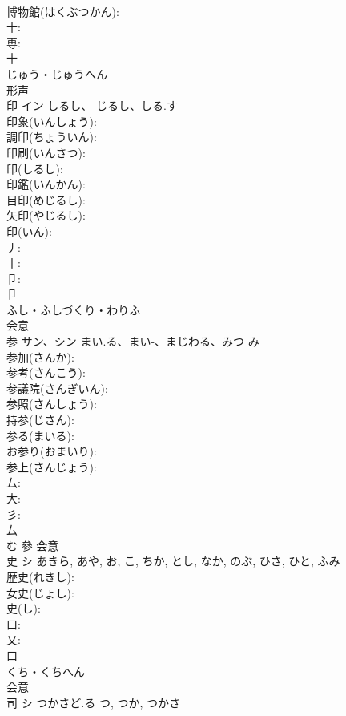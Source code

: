 \documentclass[8pt]{extreport}
\begin{document}
\begin{CJK}{UTF8}{min}
\\	博物館(はくぶつかん): 
\\	十: 
\\	尃: 
\\	十	
\\	じゅう・じゅうへん	
\\	形声 
\\	印	イン	しるし、-じるし、しる.す		
\\	印象(いんしょう): 
\\	調印(ちょういん): 
\\	印刷(いんさつ): 
\\	印(しるし): 
\\	印鑑(いんかん): 
\\	目印(めじるし): 
\\	矢印(やじるし): 
\\	印(いん): 
\\	丿: 
\\	丨: 
\\	卩: 
\\	卩	
\\	ふし・ふしづくり・わりふ	
\\	会意 
\\	参	サン、シン	まい.る、まい-、まじわる、みつ	み	
\\	参加(さんか): 
\\	参考(さんこう): 
\\	参議院(さんぎいん): 
\\	参照(さんしょう): 
\\	持参(じさん): 
\\	参る(まいる): 
\\	お参り(おまいり): 
\\	参上(さんじょう): 
\\	厶: 
\\	大: 
\\	彡: 
\\	厶	
\\	む	參	会意 
\\	史	シ		あきら, あや, お, こ, ちか, とし, なか, のぶ, ひさ, ひと, ふみ	
\\	歴史(れきし): 
\\	女史(じょし): 
\\	史(し): 
\\	口: 
\\	乂: 
\\	口	
\\	くち・くちへん	
\\	会意 
\\	司	シ	つかさど.る	つ, つか, つかさ	

\end{CJK}
\end{document}
